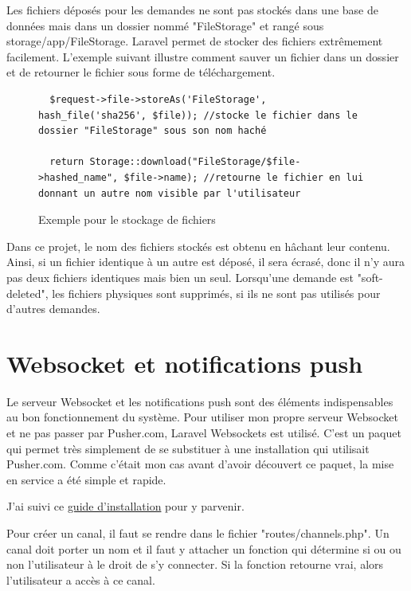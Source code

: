 \documentclass[
    iai, %
    eai, %
]{heig-tb}
\begin{document}
\newpage
Les fichiers déposés pour les demandes ne sont pas stockés dans une base de données mais dans un dossier nommé "FileStorage" et rangé sous storage/app/FileStorage. Laravel permet de stocker des fichiers extrêmement facilement. L'exemple suivant illustre comment sauver un fichier dans un dossier et de retourner le fichier sous forme de téléchargement.

\begin{figure}[h]
  \begin{verbatim}
  $request->file->storeAs('FileStorage', hash_file('sha256', $file)); //stocke le fichier dans le dossier "FileStorage" sous son nom haché

  return Storage::download("FileStorage/$file->hashed_name", $file->name); //retourne le fichier en lui donnant un autre nom visible par l'utilisateur
  \end{verbatim}
  \caption{Exemple pour le stockage de fichiers}
\end{figure}

Dans ce projet, le nom des fichiers stockés est obtenu en hâchant leur contenu. Ainsi, si un fichier identique à un autre est déposé, il sera écrasé, donc il n'y aura pas deux fichiers identiques mais bien un seul. Lorsqu'une demande est "soft-deleted", les fichiers physiques sont supprimés, si ils ne sont pas utilisés pour d'autres demandes.

\section{Websocket et notifications push}
Le serveur Websocket et les notifications push sont des éléments indispensables au bon fonctionnement du système. Pour utiliser mon propre serveur Websocket et ne pas passer par Pusher.com, Laravel Websockets est utilisé. C'est un paquet qui permet très simplement de se substituer à une installation qui utilisait Pusher.com. Comme c'était mon cas avant d'avoir découvert ce paquet, la mise en service a été simple et rapide.

J'ai suivi ce \href{https://beyondco.de/docs/laravel-websockets/getting-started/installation}{guide d'installation} pour y parvenir.

Pour créer un canal, il faut se rendre dans le fichier "routes/channels.php". Un canal doit porter un nom et il faut y attacher un fonction qui détermine si ou ou non l'utilisateur à le droit de s'y connecter. Si la fonction retourne vrai, alors l'utilisateur a accès à ce canal.
\end{document}
